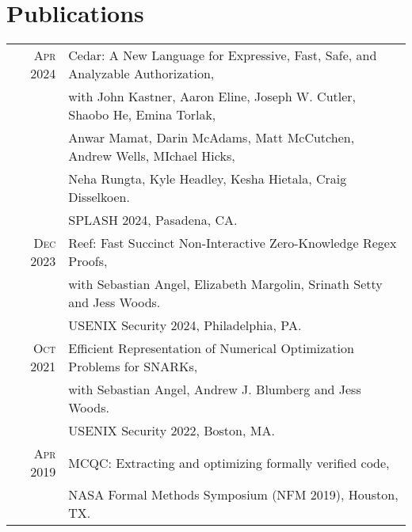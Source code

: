 \documentclass[lettersize,11pt]{article}
\begin{document}
\section{Publications}
\begin{tabular}{rl}
    \textsc{Apr} 2024 & Cedar: A New Language for Expressive, Fast, Safe, and Analyzable Authorization, \\
                      & with John Kastner, Aaron Eline, Joseph W. Cutler, Shaobo He, Emina Torlak, \\
                      & Anwar Mamat, Darin McAdams, Matt McCutchen, Andrew Wells, MIchael Hicks, \\
                      & Neha Rungta, Kyle Headley, Kesha Hietala, Craig Disselkoen. \\
                      & SPLASH 2024, Pasadena, CA.  \\[0.5em]
    \textsc{Dec} 2023 & Reef: Fast Succinct Non-Interactive Zero-Knowledge Regex Proofs, \\
                      & with Sebastian Angel, Elizabeth Margolin, Srinath Setty and Jess Woods. \\
                      & USENIX Security 2024, Philadelphia, PA.  \\[0.5em]
    \textsc{Oct} 2021 & Efficient Representation of Numerical Optimization Problems for SNARKs, \\
                      & with Sebastian Angel, Andrew J. Blumberg and Jess Woods. \\
                      & USENIX Security 2022, Boston, MA.  \\[0.5em]
    \textsc{Apr} 2019 & MCQC: Extracting and optimizing formally verified code, \\
                      & NASA Formal Methods Symposium (NFM 2019), Houston, TX. \\
\end{tabular}
\end{document}
